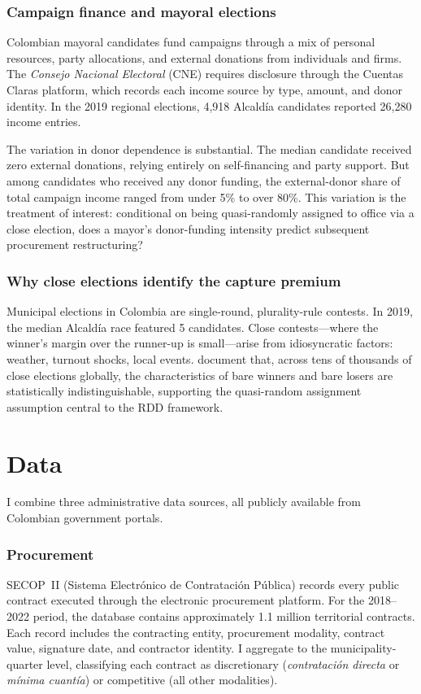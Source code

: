\documentclass[12pt]{article}
\begin{document}
\subsubsection*{Campaign finance and mayoral elections} Colombian mayoral candidates fund campaigns through a mix of personal resources, party allocations, and external donations from individuals and firms. The \textit{Consejo Nacional Electoral} (CNE) requires disclosure through the Cuentas Claras platform, which records each income source by type, amount, and donor identity. In the 2019 regional elections, 4,918 Alcald\'{i}a candidates reported 26,280 income entries.

The variation in donor dependence is substantial. The median candidate received zero external donations, relying entirely on self-financing and party support. But among candidates who received any donor funding, the external-donor share of total campaign income ranged from under 5\% to over 80\%. This variation is the treatment of interest: conditional on being quasi-randomly assigned to office via a close election, does a mayor's donor-funding intensity predict subsequent procurement restructuring?

\subsubsection*{Why close elections identify the capture premium} Municipal elections in Colombia are single-round, plurality-rule contests. In 2019, the median Alcald\'{i}a race featured 5 candidates. Close contests---where the winner's margin over the runner-up is small---arise from idiosyncratic factors: weather, turnout shocks, local events. \citet{eggers2015validity} document that, across tens of thousands of close elections globally, the characteristics of bare winners and bare losers are statistically indistinguishable, supporting the quasi-random assignment assumption central to the RDD framework.

\section{Data}
\label{sec:data}

I combine three administrative data sources, all publicly available from Colombian government portals.

\subsubsection*{Procurement} SECOP~II (Sistema Electr\'{o}nico de Contrataci\'{o}n P\'{u}blica) records every public contract executed through the electronic procurement platform. For the 2018--2022 period, the database contains approximately 1.1 million territorial contracts. Each record includes the contracting entity, procurement modality, contract value, signature date, and contractor identity. I aggregate to the municipality-quarter level, classifying each contract as discretionary (\textit{contrataci\'{o}n directa} or \textit{m\'{i}nima cuant\'{i}a}) or competitive (all other modalities).
\end{document}
